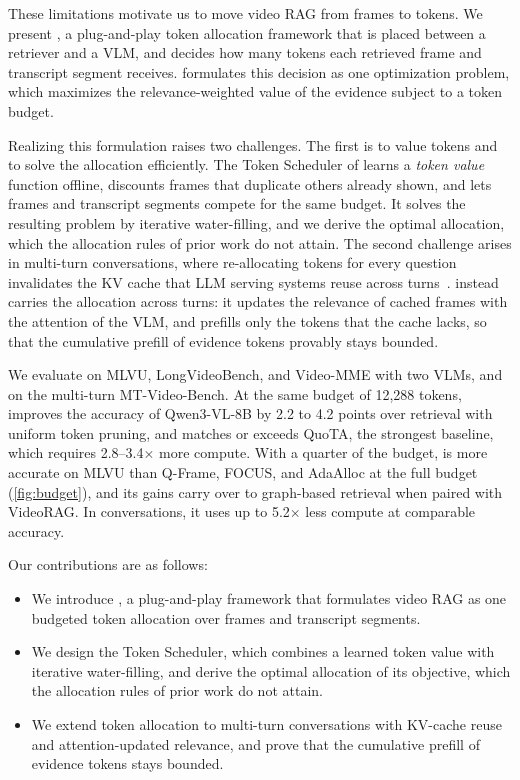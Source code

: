 These limitations motivate us to move video RAG from frames to tokens. We present \name, a plug-and-play
token allocation framework that is placed between a retriever and a VLM, and decides how
many tokens each retrieved frame and transcript segment receives. \name formulates this decision as one optimization
problem, which maximizes the relevance-weighted value of the evidence subject to a token budget.

Realizing this formulation raises two challenges. The first is to value tokens and to solve the allocation
efficiently. The Token Scheduler of \name learns a \textit{token value} function offline, discounts frames that
duplicate others already shown, and lets frames and transcript segments compete for the same budget. It solves the
resulting problem by iterative water-filling, and we derive the optimal allocation, which the
allocation rules of prior work do not attain. The second challenge arises in multi-turn conversations, where re-allocating tokens
for every question invalidates the KV cache that LLM serving systems reuse across
turns~\cite{kwon2023vllm,zheng2024sglang}. \name instead carries the allocation across turns: it updates the
relevance of cached frames with the attention of the VLM, and prefills only the tokens that the cache lacks, so that
the cumulative prefill of evidence tokens provably stays bounded.

We evaluate \name on MLVU, LongVideoBench, and Video-MME with two VLMs, and on the multi-turn MT-Video-Bench. At the
same budget of 12,288 tokens, \name improves the accuracy of Qwen3-VL-8B by 2.2 to 4.2 points over retrieval with
uniform token pruning, and matches or exceeds QuoTA, the strongest baseline, which requires 2.8--3.4$\times$ more
compute. With a quarter of the budget, \name is more accurate on MLVU than Q-Frame, FOCUS, and AdaAlloc at the full
budget (\cref{fig:budget}), and its gains carry over to graph-based retrieval when paired with VideoRAG. In
conversations, it uses up to 5.2$\times$ less compute at comparable accuracy.

Our contributions are as follows:
\begin{itemize}
  \item We introduce \name, a plug-and-play framework that formulates video RAG as one budgeted token allocation
    over frames and transcript segments.
  \item We design the Token Scheduler, which combines a learned token value with iterative water-filling, and derive
    the optimal allocation of its objective, which the allocation rules of prior work do not attain.
  \item We extend token allocation to multi-turn conversations with KV-cache reuse and attention-updated
    relevance, and prove that the cumulative prefill of evidence tokens stays bounded.
\end{itemize}
